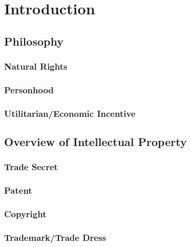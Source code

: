 \section{Introduction}

\subsection{Philosophy}

\subsubsection{Natural Rights}


\subsubsection{Personhood}


\subsubsection{Utilitarian/Economic Incentive}


\subsection{Overview of Intellectual Property}

\subsubsection{Trade Secret}


\subsubsection{Patent}


\subsubsection{Copyright}


\subsubsection{Trademark/Trade Dress}

